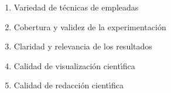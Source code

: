 \begin{enumerate}[itemsep=0em]
\item{Variedad de t\'{e}cnicas de empleadas}
\item{Cobertura y validez de la experimentaci\'{o}n}
\item{Claridad y relevancia de los resultados}    
\item{Calidad de visualizaci\'{o}n cient\'{\i}fica}
\item{Calidad de redacci\'{o}n cient\'{\i}fica}
\end{enumerate}
